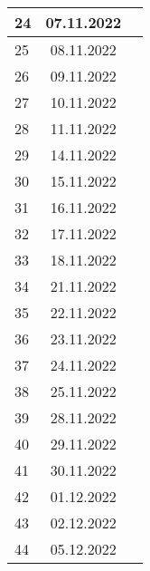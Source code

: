\begin{longtable}{|l|c|l|}
24  & 07.11.2022    &                                                       \\ \hline   
25  & 08.11.2022    &                                                       \\ \hline   
26  & 09.11.2022    &                                                       \\ \hline   
27  & 10.11.2022    &                                                       \\ \hline   
28  & 11.11.2022    &                                                    \\ \hline  
29  & 14.11.2022    &                                                       \\ \hline   
30  & 15.11.2022    &                                                       \\ \hline   
31  & 16.11.2022    &                                                       \\ \hline   
32  & 17.11.2022    &                                                       \\ \hline   
33  & 18.11.2022    &                                                       \\ \hline
34  & 21.11.2022    &                                                       \\ \hline 
35  & 22.11.2022    &                                                       \\ \hline   
36  & 23.11.2022    &                                                       \\ \hline   
37  & 24.11.2022    &                                                       \\ \hline   
38  & 25.11.2022    &                                                       \\ \hline   
39  & 28.11.2022    &                                                       \\ \hline   
40  & 29.11.2022    &                                                       \\ \hline   
41  & 30.11.2022    &                                                       \\ \hline   
42  & 01.12.2022    &                                                       \\ \hline   
43  & 02.12.2022    &                                                       \\ \hline   
44  & 05.12.2022    &                                                       \\ \hline   

\end{longtable}
